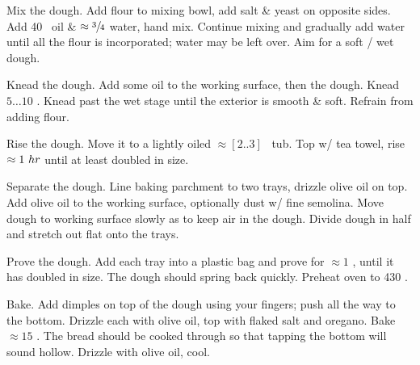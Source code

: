 \begin{preparation}
\item Mix the dough.
    Add flour to mixing bowl, add salt \& yeast on opposite sides.
    Add 40 \milliliter~oil \& $\approx\threefourth$ water, hand mix.
    Continue mixing and gradually add water until all the flour is
    incorporated; water may be left over.
    Aim for a soft / wet dough.

\item Knead the dough.
    Add some oil to the working surface, then the dough.
    Knead $5 \dots 10$ \minute.
    Knead past the wet stage until the exterior is smooth \& soft.
    Refrain from adding flour.

\item Rise the dough.
    Move it to a lightly oiled $\approx [2 .. 3]$ \quart~tub.
    Top w/ tea towel, rise $\approx 1~\hour$ until at least doubled in size.

\item Separate the dough.
    Line baking parchment to two trays, drizzle olive oil on top.
    Add olive oil to the working surface, optionally dust w/ fine semolina.
    Move dough to working surface slowly as to keep air in the dough.
    Divide dough in half and stretch out flat onto the trays.

\item Prove the dough.
    Add each tray into a plastic bag and prove for $\approx 1$ \hour, until
    it has doubled in size.
    The dough should spring back quickly.
    Preheat oven to 430 \Fahrenheit.

\item Bake.
    Add dimples on top of the dough using your fingers; push all the way to the bottom.
    Drizzle each with olive oil, top with flaked salt and oregano.
    Bake $\approx 15$ \minute.
    The bread should be cooked through so that tapping the bottom will sound hollow.
    Drizzle with olive oil, cool.
\end{preparation}

\recipeend%
